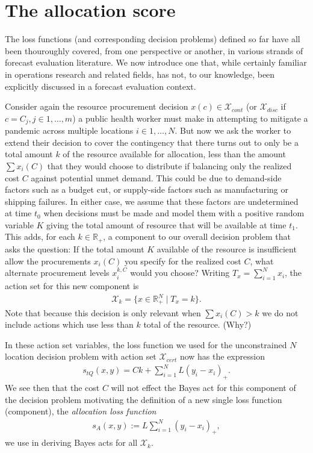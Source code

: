 \documentclass{article}
\begin{document}
\section{The allocation score}

The loss functions (and corresponding decision problems) defined so far have all been thouroughly covered, from one perspective or another, in various strands of forecast evaluation literature.  We now introduce one that, while certainly familiar in operations research and related fields, has not, to our knowledge, been explicitly discussed in a forecast evaluation context. 

Consider again the resource procurement decision $x(c) \in \mathcal{X}_{cont}$ (or $\mathcal{X}_{disc}$ if $c = C_j, j \in 1,\ldots,m$) a public health worker must make in 
attempting to mitigate a pandemic across multiple locations $i \in 1,\ldots,N$.  But now we ask the worker to extend their decision to cover the contingency that there turns out to only be a total amount $k$ of the resource available for allocation, less than the amount $\sum x_i(C)$ that they would choose to distribute if balancing only the realized cost $C$ against potential unmet demand.  This could be due to demand-side factors such as a budget cut, or supply-side factors such as manufacturing or shipping failures. In either case, we assume that these factors are undetermined at time $t_0$ when decisions must be made and model them with a positive random variable $K$ giving the total amount of resource that will be available
at time $t_1$.  This adds, for each $k \in \mathbb{R}_{+}$, a component to our overall decision problem that asks the question: If the total amount $K$ available of the resource is insufficient allow the procurements $x_i(C)$ you specify for the realized cost $C$, what alternate procurement levels $x_i^{k,C}$ would you choose? Writing $T_x = \sum_{i=1}^{N} x_i$, the action set for this new component is 
\begin{align}
\mathcal{X}_k = \{x \in \mathbb{R}_{+}^N \mid T_x = k\}.
\end{align}
Note that because this decision is only relevant when $\sum x_i(C)>k$ we do not include actions which use less than $k$ total of the resource. (Why?)
 
In these action set variables, the loss function we used for the unconstrained $N$ location decision problem with action set $\mathcal{X}_{cert}$ now has the expression
\begin{align}
s_{tQ}\left(x, y\right) = Ck + \sum_{i=1}^{N} L(y_i - x_i)_{+}.
\end{align}
We see then that the cost $C$ will not effect the Bayes act for this component of the decision problem motivating the definition of a new single loss function (component), the \emph{allocation loss function}
\begin{align}
s_{A}(x,y):= L\sum_{i=1}^{N} (y_i - x_i)_{+},
\end{align}
we use in deriving Bayes acts for all $\mathcal{X}_k$.
\end{document}
